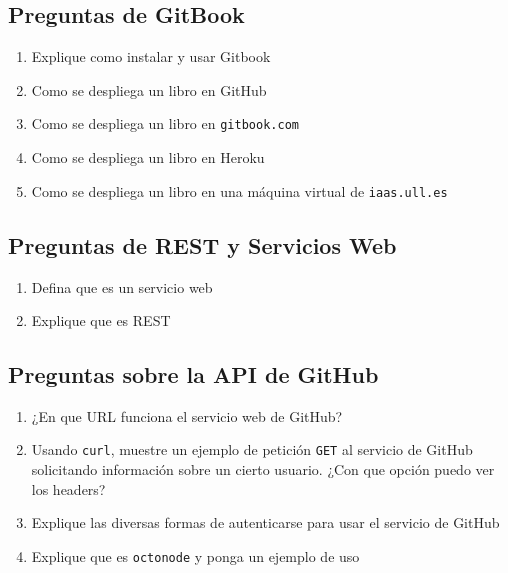 \subsection{Preguntas de GitBook}\label{preguntas-de-gitbook}

\begin{enumerate}
\def\labelenumi{\arabic{enumi}.}
\itemsep1pt\parskip0pt
\item
  Explique como instalar y usar Gitbook
\item
  Como se despliega un libro en GitHub
\item
  Como se despliega un libro en \texttt{gitbook.com}
\item
  Como se despliega un libro en Heroku
\item
  Como se despliega un libro en una máquina virtual de
  \texttt{iaas.ull.es}
\end{enumerate}

\subsection{Preguntas de REST y Servicios
Web}\label{preguntas-de-rest-y-servicios-web}

\begin{enumerate}
\def\labelenumi{\arabic{enumi}.}
\itemsep1pt\parskip0pt
\item
  Defina que es un servicio web
\item
  Explique que es REST
\end{enumerate}

\subsection{Preguntas sobre la API de
GitHub}\label{preguntas-sobre-la-api-de-github}

\begin{enumerate}
\def\labelenumi{\arabic{enumi}.}
\itemsep1pt\parskip0pt
\item
  ¿En que URL funciona el servicio web de GitHub? 
\item
  Usando \texttt{curl}, muestre un ejemplo de petición \texttt{GET} al
  servicio de GitHub solicitando información sobre un cierto usuario.
  ¿Con que opción puedo ver los headers? 
\item
  Explique las diversas formas de autenticarse para usar el servicio de
  GitHub
\item
  Explique que es \texttt{octonode} y ponga un ejemplo de uso
\end{enumerate}

